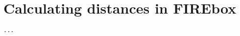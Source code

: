 
\chapter{Calculating distances in FIREbox}
\begin{lstlisting}[language=Python]
    ...
\end{lstlisting}